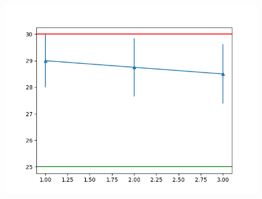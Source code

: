 \documentclass[9pt]{article}
\begin{document}
\begin{figure}
\begin{multicols}{4}[\columnsep=1cm]
    \includegraphics[width=\linewidth]{b}
    \end{multicols}
    

\end{figure}
\end{document}
